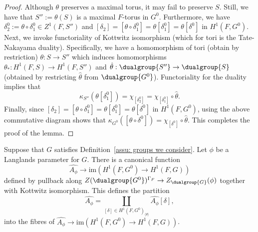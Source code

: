 \documentclass[11pt,letterpaper]{amsart}
\numberwithin{equation}{section}
\begin{document}
\begin{proof}
    Although $\theta$ preserves a maximal torus, it may fail to preserve $S.$ Still, we have that $S'':=\theta(S)$ is a maximal $F$-torus in $G^0$. Furthermore, we have $\delta_2^0:=\theta\circ \delta_1^0\in Z^1(F,S'')$ and $[\delta_2]=[\theta\circ \delta_1^0]=\theta[\delta_1^0]=\theta[\delta^0]$ in $H^1(F,G^0).$
     Next, we invoke functoriality of Kottwitz isomorphism (which for tori is the Tate-Nakayama duality). Specifically, we have a homomorphism of tori (obtain by restriction) $\theta:S\rightarrow S''$ which induces homomorphisms $\theta_*:H^1(F,S)\rightarrow H^1(F,S'')$ and $\hat{\theta}:\dualgroup{S''}\rightarrow\dualgroup{S}$ (obtained by restricting $\hat{\theta}$ from $\dualgroup{G^0}$). Functoriality for the duality implies that 
     \[
     \kappa_{S''}(\theta[\delta_1^0])= \chi_{[\delta_2^0]}=\chi_{[\delta_1^0]}\circ\hat{\theta}.
     \]
     Finally, since $[\delta_2]=[\theta\circ \delta_1^0]=\theta[\delta_1^0]=\theta[\delta^0]$ in $H^1(F,G^0)$, using the above commutative diagram shows that $\kappa_{G^0}([\theta\circ\delta^0])=\chi_{[\delta^0]}\circ \hat{\theta}.$ This completes the proof of the lemma.
\end{proof}


\begin{proposition}
    \label{proposition: enhancement by purity}
   Suppose that $G$ satisfies Definition~\ref{assu: groups we consider}. Let $\phi$ be a Langlands parameter for $G$. 
There is a canonical function
\[
\widehat{A_\phi} \to \mathrm{im}(H^1(F,G^0)\to H^1(F,G))
\]
defined by pullback along $Z(\dualgroup{G^0})^{\Gamma_F} \to Z_{\dualgroup{G}}(\phi)$ together with Kottwitz isomorphism.
This defines the partition
\[
\widehat{A_\phi}
=
\coprod_{[\delta]\in H^1(F,G^0)_{\langle\theta \rangle}}\widehat{A_\phi}[\delta],
\]
into the fibres of $\widehat{A_\phi} \to \mathrm{im}(H^1(F,G^0)\to H^1(F,G))$.
\end{proposition}
\end{document}
